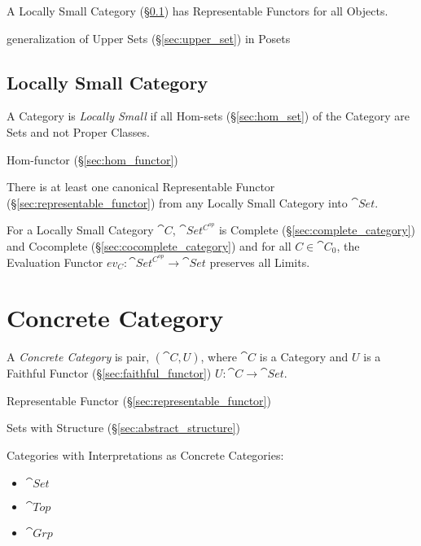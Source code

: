 A Locally Small Category (\S\ref{sec:locally_small}) has Representable
Functors for all Objects.

generalization of Upper Sets (\S\ref{sec:upper_set}) in Posets



\subsection{Locally Small Category}\label{sec:locally_small}

A Category is \emph{Locally Small} if all Hom-sets
(\S\ref{sec:hom_set}) of the Category are Sets and not Proper Classes.

Hom-functor (\S\ref{sec:hom_functor})

There is at least one canonical Representable Functor
(\S\ref{sec:representable_functor}) from any Locally Small Category
into $\cat{Set}$.

For a Locally Small Category $\cat{C}$, $\cat{Set^{C^{op}}}$ is
Complete (\S\ref{sec:complete_category}) and Cocomplete
(\S\ref{sec:cocomplete_category}) and for all $C \in \cat{C}_0$,
the Evaluation Functor $ev_C : \cat{Set^{C^{op}}} \rightarrow
\cat{Set}$ preserves all Limits. \cite{awodey06}



\section{Concrete Category}\label{sec:concrete_category}

A \emph{Concrete Category} is pair, $(\cat{C},U)$, where $\cat{C}$ is
a Category and $U$ is a Faithful Functor
(\S\ref{sec:faithful_functor}) $U : \cat{C} \rightarrow \cat{Set}$.

Representable Functor (\S\ref{sec:representable_functor})

Sets with Structure (\S\ref{sec:abstract_structure})

Categories with Interpretations as Concrete Categories:
\begin{itemize}
  \item $\cat{Set}$
  \item $\cat{Top}$
  \item $\cat{Grp}$
\end{itemize}

